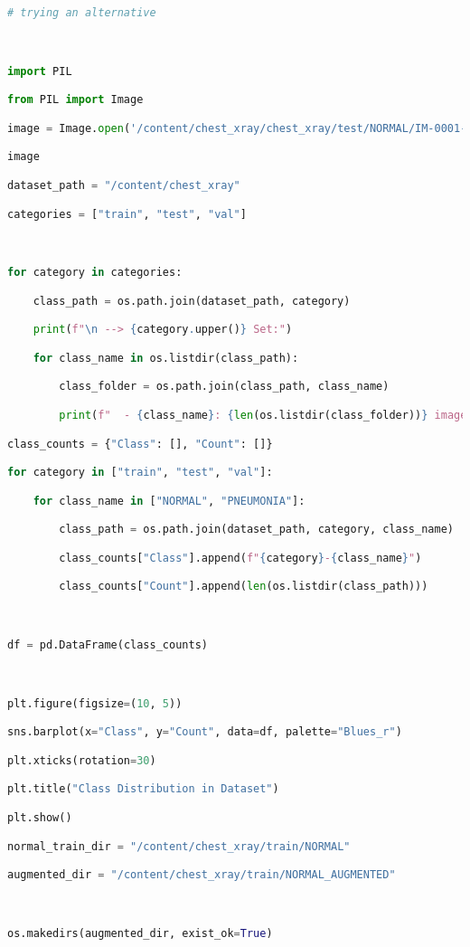 \documentclass{article}
\begin{document}
\begin{lstlisting}[style=mystyle,language=Python]
# trying an alternative



import PIL

from PIL import Image

image = Image.open('/content/chest_xray/chest_xray/test/NORMAL/IM-0001-0001.jpeg')

image

dataset_path = "/content/chest_xray"

categories = ["train", "test", "val"]



for category in categories:

    class_path = os.path.join(dataset_path, category)

    print(f"\n --> {category.upper()} Set:")

    for class_name in os.listdir(class_path):

        class_folder = os.path.join(class_path, class_name)

        print(f"  - {class_name}: {len(os.listdir(class_folder))} images")

class_counts = {"Class": [], "Count": []}

for category in ["train", "test", "val"]:

    for class_name in ["NORMAL", "PNEUMONIA"]:

        class_path = os.path.join(dataset_path, category, class_name)

        class_counts["Class"].append(f"{category}-{class_name}")

        class_counts["Count"].append(len(os.listdir(class_path)))



df = pd.DataFrame(class_counts)



plt.figure(figsize=(10, 5))

sns.barplot(x="Class", y="Count", data=df, palette="Blues_r")

plt.xticks(rotation=30)

plt.title("Class Distribution in Dataset")

plt.show()

normal_train_dir = "/content/chest_xray/train/NORMAL"

augmented_dir = "/content/chest_xray/train/NORMAL_AUGMENTED"



os.makedirs(augmented_dir, exist_ok=True)




\end{lstlisting}
\end{document}
